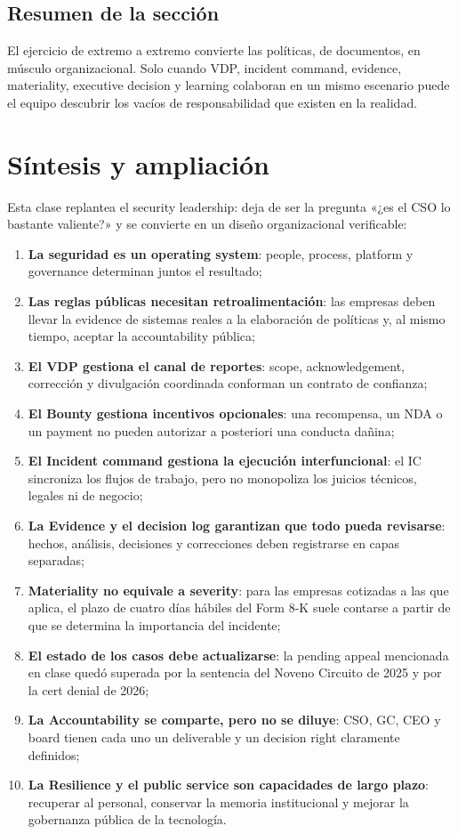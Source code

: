 \documentclass[a4paper]{article}
\begin{document}
\subsection{Resumen de la sección}

El ejercicio de extremo a extremo convierte las políticas, de documentos, en músculo organizacional. Solo cuando VDP, incident command, evidence, materiality, executive decision y learning colaboran en un mismo escenario puede el equipo descubrir los vacíos de responsabilidad que existen en la realidad.
\section{Síntesis y ampliación}

Esta clase replantea el security leadership: deja de ser la pregunta «¿es el CSO lo bastante valiente?» y se convierte en un diseño organizacional verificable:

\begin{enumerate}
  \item \textbf{La seguridad es un operating system}: people, process, platform y governance determinan juntos el resultado;
  \item \textbf{Las reglas públicas necesitan retroalimentación}: las empresas deben llevar la evidence de sistemas reales a la elaboración de políticas y, al mismo tiempo, aceptar la accountability pública;
  \item \textbf{El VDP gestiona el canal de reportes}: scope, acknowledgement, corrección y divulgación coordinada conforman un contrato de confianza;
  \item \textbf{El Bounty gestiona incentivos opcionales}: una recompensa, un NDA o un payment no pueden autorizar a posteriori una conducta dañina;
  \item \textbf{El Incident command gestiona la ejecución interfuncional}: el IC sincroniza los flujos de trabajo, pero no monopoliza los juicios técnicos, legales ni de negocio;
  \item \textbf{La Evidence y el decision log garantizan que todo pueda revisarse}: hechos, análisis, decisiones y correcciones deben registrarse en capas separadas;
  \item \textbf{Materiality no equivale a severity}: para las empresas cotizadas a las que aplica, el plazo de cuatro días hábiles del Form 8-K suele contarse a partir de que se determina la importancia del incidente;
  \item \textbf{El estado de los casos debe actualizarse}: la pending appeal mencionada en clase quedó superada por la sentencia del Noveno Circuito de 2025 y por la cert denial de 2026;
  \item \textbf{La Accountability se comparte, pero no se diluye}: CSO, GC, CEO y board tienen cada uno un deliverable y un decision right claramente definidos;
  \item \textbf{La Resilience y el public service son capacidades de largo plazo}: recuperar al personal, conservar la memoria institucional y mejorar la gobernanza pública de la tecnología.
\end{enumerate}
\end{document}
